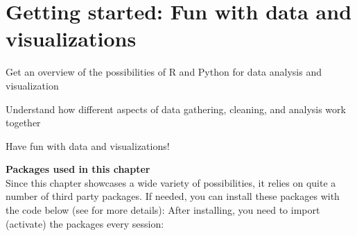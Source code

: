 \chapter{Getting started: Fun with data and visualizations}
\label{chap:fundata}

\begin{abstract}{Abstract}
  This chapter gives a lightning tour of some of the cool (and informative) things you can do with R and Python.
  Starting from a dataset of tweets about COVID-19, we show how you can analyze this data using
  text analysis, network analysis, and using geographic information.
  The goal of this chapter is not to teach you all these techniques in detail.
  Rather, each of the examples showcases a possibility and guides you to the chapter where it will be explained in more detail.
  So don't worry too much about understanding every line of code, but relax and enjoy the ride!
\end{abstract}


\begin{objectives}
\item Get an overview of the possibilities of R and Python for data analysis and visualization
\item Understand how different aspects of data gathering, cleaning, and analysis work together
\item Have fun with data and visualizations!
\end{objectives}

\newpage
\begin{feature}
  \textbf{Packages used in this chapter}\\
  Since this chapter showcases a wide variety of possibilities,
  it relies on quite a number of third party packages.
  If needed, you can install these packages with the code below
  (see  for more details):
  \noindent After installing, you need to import (activate) the packages every session:
\end{feature}




